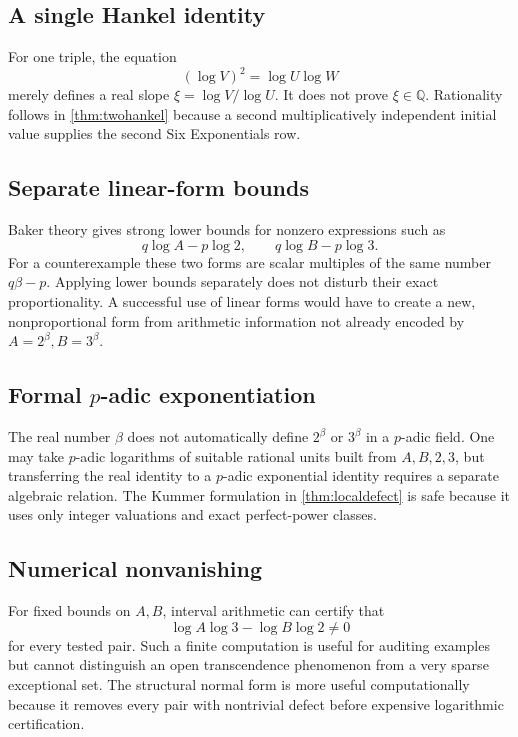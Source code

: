 \documentclass[11pt]{article}
\numberwithin{equation}{section}
\theoremstyle{definition}
\newcommand{\Q}{\mathbb{Q}}
\begin{document}
\subsection{A single Hankel identity}

For one triple, the equation
\[
       (\log V)^2=\log U\log W
\]
merely defines a real slope \(\xi=\log V/\log U\). It does not prove \(\xi\in\Q\). Rationality follows in \cref{thm:twohankel} because a second multiplicatively independent initial value supplies the second Six Exponentials row.

\subsection{Separate linear-form bounds}

Baker theory gives strong lower bounds for nonzero expressions such as
\[
       q\log A-p\log2,
       \qquad
       q\log B-p\log3.
\]
For a counterexample these two forms are scalar multiples of the same number \(q\beta-p\). Applying lower bounds separately does not disturb their exact proportionality. A successful use of linear forms would have to create a new, nonproportional form from arithmetic information not already encoded by \(A=2^\beta,B=3^\beta\).

\subsection{Formal \(p\)-adic exponentiation}

The real number \(\beta\) does not automatically define \(2^\beta\) or \(3^\beta\) in a \(p\)-adic field. One may take \(p\)-adic logarithms of suitable rational units built from \(A,B,2,3\), but transferring the real identity to a \(p\)-adic exponential identity requires a separate algebraic relation. The Kummer formulation in \cref{thm:localdefect} is safe because it uses only integer valuations and exact perfect-power classes.

\subsection{Numerical nonvanishing}

For fixed bounds on \(A,B\), interval arithmetic can certify that
\[
       \log A\log3-\log B\log2\ne0
\]
for every tested pair. Such a finite computation is useful for auditing examples but cannot distinguish an open transcendence phenomenon from a very sparse exceptional set. The structural normal form is more useful computationally because it removes every pair with nontrivial defect before expensive logarithmic certification.
\end{document}
